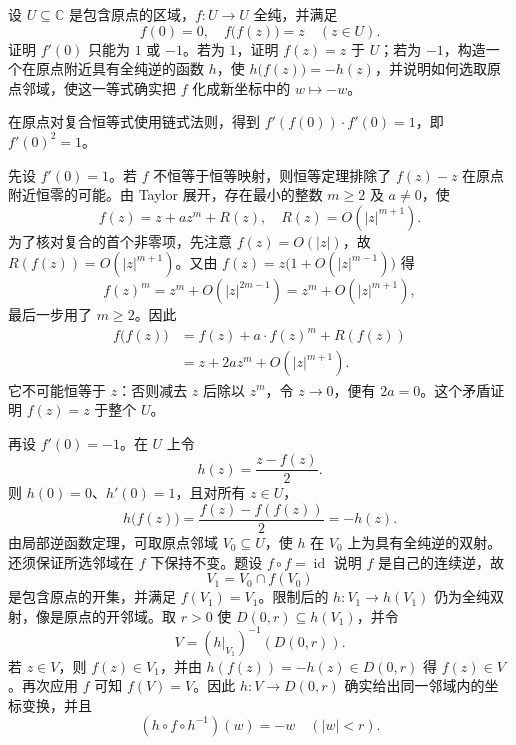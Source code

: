\begin{exercise}\label{b3:ex:01-local-involution}
设 \(U\subseteq\mathbb C\) 是包含原点的区域，\(f:U\rightarrow U\) 全纯，并满足
\[
  f(0)=0,\quad f\bigl(f(z)\bigr)=z\quad(z\in U).
\]
证明 \(f'(0)\) 只能为 \(1\) 或 \(-1\)。若为 \(1\)，证明 \(f(z)=z\) 于 \(U\)；若为 \(-1\)，构造一个在原点附近具有全纯逆的函数 \(h\)，使
\(h\bigl(f(z)\bigr)=-h(z)\)，并说明如何选取原点邻域，使这一等式确实把 \(f\) 化成新坐标中的 \(w\mapsto-w\)。
\end{exercise}
\begin{solution}
在原点对复合恒等式使用链式法则，得到
\(f'(f(0))\cdot f'(0)=1\)，即 \(f'(0)^2=1\)。

先设 \(f'(0)=1\)。若 \(f\) 不恒等于恒等映射，则恒等定理排除了 \(f(z)-z\) 在原点附近恒零的可能。由 Taylor 展开，存在最小的整数 \(m\ge2\) 及 \(a\ne0\)，使
\[
  f(z)=z+az^m+R(z),\quad R(z)=O(|z|^{m+1}).
\]
为了核对复合的首个非零项，先注意 \(f(z)=O(|z|)\)，故
\(R(f(z))=O(|z|^{m+1})\)。又由
\(f(z)=z\bigl(1+O(|z|^{m-1})\bigr)\) 得
\[
  f(z)^m=z^m+O(|z|^{2m-1})
         =z^m+O(|z|^{m+1}),
\]
最后一步用了 \(m\ge2\)。因此
\[
\begin{aligned}
  f\bigl(f(z)\bigr)
  &=f(z)+a\cdot f(z)^m+R(f(z))\\
  &=z+2az^m+O(|z|^{m+1}).
\end{aligned}
\]
它不可能恒等于 \(z\)：否则减去 \(z\) 后除以 \(z^m\)，令 \(z\to0\)，便有 \(2a=0\)。这个矛盾证明 \(f(z)=z\) 于整个 \(U\)。

再设 \(f'(0)=-1\)。在 \(U\) 上令
\[
  h(z)=\frac{z-f(z)}2.
\]
则 \(h(0)=0\)、\(h'(0)=1\)，且对所有 \(z\in U\)，
\[
  h\bigl(f(z)\bigr)
  =\frac{f(z)-f(f(z))}2
  =-h(z).
\]
由局部逆函数定理，可取原点邻域 \(V_0\subseteq U\)，使 \(h\) 在 \(V_0\) 上为具有全纯逆的双射。还须保证所选邻域在 \(f\) 下保持不变。题设 \(f\circ f=\operatorname{id}\) 说明 \(f\) 是自己的连续逆，故
\[
  V_1=V_0\cap f(V_0)
\]
是包含原点的开集，并满足 \(f(V_1)=V_1\)。限制后的 \(h:V_1\rightarrow h(V_1)\) 仍为全纯双射，像是原点的开邻域。取 \(r>0\) 使 \(D(0,r)\subseteq h(V_1)\)，并令
\[
  V=(h|_{V_1})^{-1}(D(0,r)).
\]
若 \(z\in V\)，则 \(f(z)\in V_1\)，并由 \(h(f(z))=-h(z)\in D(0,r)\) 得 \(f(z)\in V\)。再次应用 \(f\) 可知 \(f(V)=V\)。因此 \(h:V\rightarrow D(0,r)\) 确实给出同一邻域内的坐标变换，并且
\[
  (h\circ f\circ h^{-1})(w)=-w
  \quad(|w|<r).
\]
\end{solution}

